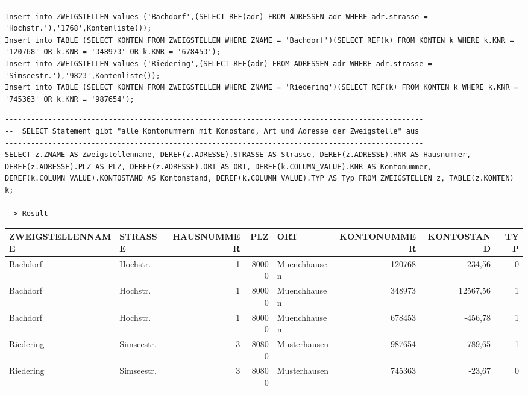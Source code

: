 \documentclass{scrartcl}
\begin{document}
\begin{landscape}
\begin{lstlisting}
--------------------------------------------------------
Insert into ZWEIGSTELLEN values ('Bachdorf',(SELECT REF(adr) FROM ADRESSEN adr WHERE adr.strasse = 'Hochstr.'),'1768',Kontenliste());
Insert into TABLE (SELECT KONTEN FROM ZWEIGSTELLEN WHERE ZNAME = 'Bachdorf')(SELECT REF(k) FROM KONTEN k WHERE k.KNR = '120768' OR k.KNR = '348973' OR k.KNR = '678453');
Insert into ZWEIGSTELLEN values ('Riedering',(SELECT REF(adr) FROM ADRESSEN adr WHERE adr.strasse = 'Simseestr.'),'9823',Kontenliste());
Insert into TABLE (SELECT KONTEN FROM ZWEIGSTELLEN WHERE ZNAME = 'Riedering')(SELECT REF(k) FROM KONTEN k WHERE k.KNR = '745363' OR k.KNR = '987654');
\end{lstlisting}
\begin{lstlisting}
-------------------------------------------------------------------------------------------------
--  SELECT Statement gibt "alle Kontonummern mit Konostand, Art und Adresse der Zweigstelle" aus
-------------------------------------------------------------------------------------------------
SELECT z.ZNAME AS Zweigstellenname, DEREF(z.ADRESSE).STRASSE AS Strasse, DEREF(z.ADRESSE).HNR AS Hausnummer, DEREF(z.ADRESSE).PLZ AS PLZ, DEREF(z.ADRESSE).ORT AS ORT, DEREF(k.COLUMN_VALUE).KNR AS Kontonummer, DEREF(k.COLUMN_VALUE).KONTOSTAND AS Kontonstand, DEREF(k.COLUMN_VALUE).TYP AS Typ FROM ZWEIGSTELLEN z, TABLE(z.KONTEN) k;

--> Result
\end{lstlisting}

\begin{tabular}{ l l r r l r r r }
ZWEIGSTELLENNAME & STRASSE & HAUSNUMMER & PLZ & ORT & KONTONUMMER & KONTOSTAND & TYP \\
\hline
Bachdorf   & Hochstr.   & 1  &  80000&  Muenchhausen    & 120768     & 234,56   &    0 \\
Bachdorf   &        Hochstr. &  1  & 80000& Muenchhausen  &   348973   & 12567,56  &     1 \\
Bachdorf   &        Hochstr.  & 1  & 80000 & Muenchhausen  &   678453   &  -456,78  &     1 \\
Riedering  &        Simseestr.& 3  & 80800 & Musterhausen  &   987654   &   789,65   &    1 \\
Riedering  &        Simseestr. & 3 &  80800 & Musterhausen  &   745363   &   -23,67  &     0 \\
\end{tabular}


\begin{lstlisting}


\end{lstlisting}
\end{landscape}
\end{document}
